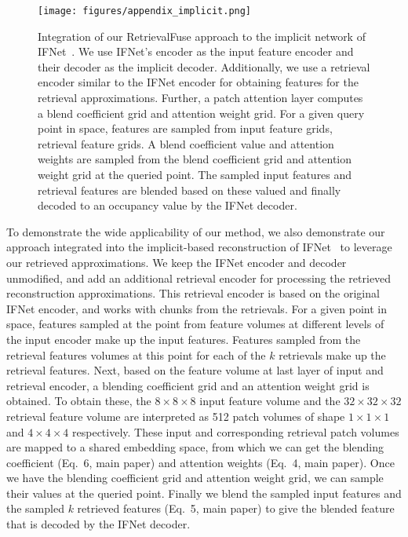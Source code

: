 \begin{figure}
	\centering
	\texttt{[image: figures/appendix\_implicit.png]}
	\caption{Integration of our RetrievalFuse approach to the implicit network of IFNet~\cite{chibane2020implicit}. 
	We use IFNet's encoder as the input feature encoder and their decoder as the implicit decoder. Additionally, we use a retrieval encoder similar to the IFNet encoder for obtaining features for the retrieval approximations. Further, a patch attention layer computes a blend coefficient grid and attention weight grid. For a given query point in space, features are sampled from input feature grids, retrieval feature grids. A blend coefficient value and attention weights are sampled from the blend coefficient grid and attention weight grid at the queried point. The sampled input features and retrieval features are blended based on these valued and finally decoded to an occupancy value by the IFNet decoder.}
	\label{fig:architecture implicit}
\end{figure}

%
To demonstrate the wide applicability of our method, we also demonstrate our approach integrated into the implicit-based reconstruction of IFNet~\cite{chibane2020implicit} to leverage our retrieved approximations.
%
We keep the IFNet encoder and decoder unmodified, and add an additional retrieval encoder for processing the retrieved reconstruction approximations.
%
This retrieval encoder is based on the original IFNet encoder, and works with chunks from the retrievals.
%
For a given point in space, features sampled at the point from feature volumes at different levels of the input encoder make up the input features.
%
Features sampled from the retrieval features volumes at this point for each of the $k$ retrievals make up the retrieval features.
%
Next, based on the feature volume at last layer of input and retrieval encoder, a blending coefficient grid and an attention weight grid is obtained.
%
To obtain these, the $8\times8\times8$ input feature volume and the $32\times32\times32$ retrieval feature volume are interpreted as 512 patch volumes of shape $1\times1\times1$ and $4\times4\times4$ respectively.
%
These input and corresponding retrieval patch volumes are mapped to a shared embedding space, from which we can get the blending coefficient (Eq.~6, main paper) and attention weights (Eq.~4, main paper).
%
Once we have the blending coefficient grid and attention weight grid, we can sample their values at the queried point.
%
Finally we blend the sampled input features and the sampled $k$ retrieved features (Eq.~5, main paper) to give the blended feature that is decoded by the IFNet decoder.
%


